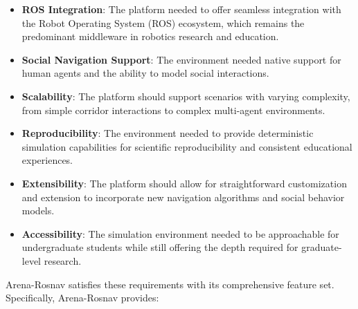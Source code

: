 \begin{itemize}
    \item \textbf{ROS Integration}: The platform needed to offer seamless integration with the Robot 
    Operating System (ROS) ecosystem, which remains the predominant middleware in robotics research 
    and education.
    \item \textbf{Social Navigation Support}: The environment needed native support for human agents 
    and the ability to model social interactions.

    \item \textbf{Scalability}: The platform should support scenarios with varying complexity, from 
    simple corridor interactions to complex multi-agent environments.

    \item \textbf{Reproducibility}: The environment needed to provide deterministic simulation capabilities 
    for scientific reproducibility and consistent educational experiences.

    \item \textbf{Extensibility}: The platform should allow for straightforward customization and extension 
    to incorporate new navigation algorithms and social behavior models.

    \item \textbf{Accessibility}: The simulation environment needed to be approachable for undergraduate 
    students while still offering the depth required for graduate-level research.
\end{itemize}

Arena-Rosnav \cite{arena30} satisfies these requirements with its comprehensive feature set. Specifically, 
Arena-Rosnav provides:

